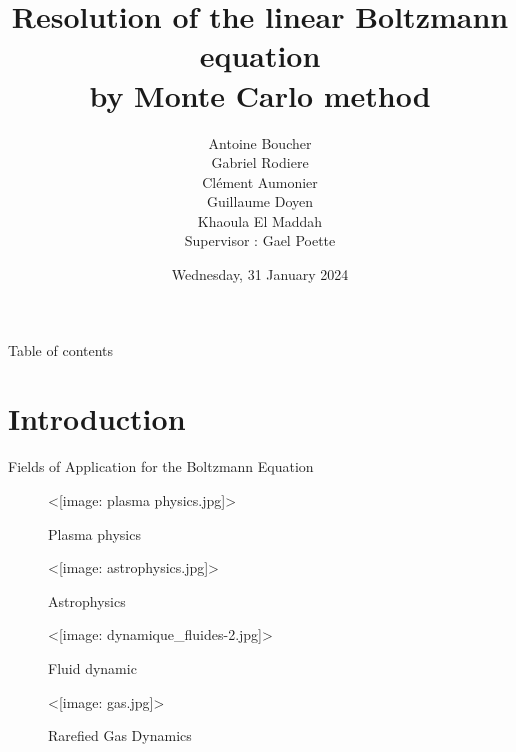 \documentclass[aspectratio=1610]{beamer}
\title{Resolution of the linear Boltzmann equation\\ by Monte Carlo method}
\subtitle{}
\author{Antoine Boucher\\
Gabriel Rodiere\\
Clément Aumonier\\
Guillaume Doyen\\
Khaoula El Maddah\\
Supervisor : Gael Poette}
\institute{}
\date{Wednesday, 31\up{st} January 2024}
\def\texttt#1{<#1>}%
\begin{document}
\begin{frame}[plain]
  \titlepage
\end{frame}

\begin{frame}{Table of contents}
  \tableofcontents
\end{frame}

\section{Introduction}
\begin{frame}{Fields of Application for the Boltzmann Equation}
\begin{multicols}{2}
    \begin{figure}
      \centering
      \texttt{[image: plasma physics.jpg]}
      \caption*{Plasma physics}
      
      \texttt{[image: astrophysics.jpg]}
      \caption*{Astrophysics}

      \texttt{[image: dynamique\_fluides-2.jpg]}
      \caption*{Fluid dynamic}
      
      \texttt{[image: gas.jpg]}
      \caption*{Rarefied Gas Dynamics}
    \end{figure}
\end{multicols}
\end{frame}
\end{document}
